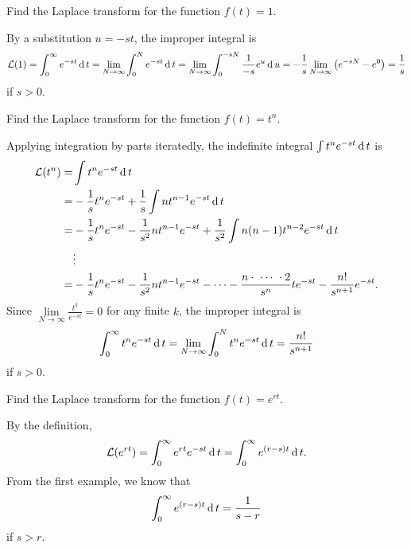 \begin{example}
Find the Laplace transform for the function $f(t)=1$.
\end{example}
\begin{solution}
By a substitution $u=-st$, the improper integral is
\[
\mathcal{L}(1)=\int_0^\infty e^{-st}\operatorname{d} t = \lim\limits_{N\to\infty} \int_0^N e^{-st}\operatorname{d} t
=\lim\limits_{N\to \infty}\int_0^{-sN}\frac{1}{-s}e^u\operatorname{d} u
=-\frac1s\lim\limits_{N\to \infty}\left(e^{-sN}-e^0\right)
=\frac1s
\]
if $s>0$.
\end{solution}

\begin{example}
  Find the Laplace transform for the function $f(t)=t^n$.
\end{example}
\begin{solution}
Applying integration by parts iteratedly, the indefinite integral $\int t^ne^{-st}\operatorname{d} t$ is
\[
\begin{aligned}
\mathcal{L}(t^n)=&\int t^n e^{-st}\operatorname{d} t\\
 =& -\frac{1}{s}t^ne^{-st}+\frac1s\int nt^{n-1}e^{-st}\operatorname{d} t\\ 
=& -\frac{1}{s}t^ne^{-st}-\frac{1}{s^2} nt^{n-1}e^{-st}+\frac{1}{s^2}\int n(n-1)t^{n-2}e^{-st}\operatorname{d} t\\
&\vdots\\
=& -\frac{1}{s}t^ne^{-st}-\frac{1}{s^2} nt^{n-1}e^{-st}-\cdots-\frac{n\cdot~\cdots~\cdot 2}{s^{n}}t e^{-st}-\frac{n!}{s^{n+1}}e^{-st}. 
\end{aligned}
\]
Since $\lim\limits_{N\to \infty}\frac{t^k}{e^{-st}}=0$ for any finite $k$, the improper integral is
\[
\int_0^\infty  t^n e^{-st}\operatorname{d} t = \lim\limits_{N\to \infty}\int_0^N t^n e^{-st}\operatorname{d} t=\frac{n!}{s^{n+1}}
\]
if $s>0$.
\end{solution}

\begin{exercise}
  Find the Laplace transform for the function $f(t)=e^{rt}$.
\end{exercise}
\begin{exersol}
  By the definition,
  \[\mathcal{L}(e^{rt})=\int_0^\infty e^{rt}e^{-st}\operatorname{d} t=\int_0^\infty e^{(r-s)t}\operatorname{d} t.\]
  From the first example, we know that
  \[\int_0^\infty e^{(r-s)t}\operatorname{d} t=\frac{1}{s-r}\]
  if $s>r$.
\end{exersol}

